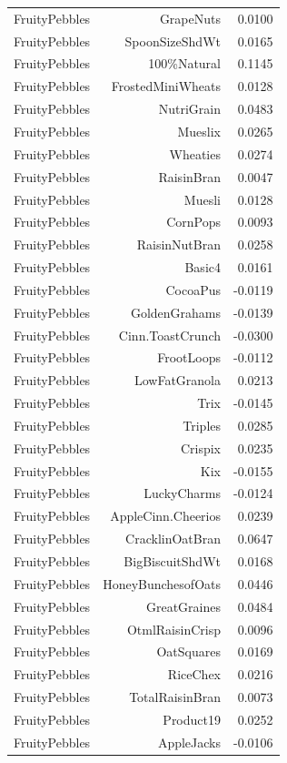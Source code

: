 \begin{longtable}{@{}lrr@{}}
FruityPebbles & GrapeNuts & 0.0100 \\
FruityPebbles & SpoonSizeShdWt & 0.0165 \\
FruityPebbles & 100\%Natural & 0.1145 \\
FruityPebbles & FrostedMiniWheats & 0.0128 \\
FruityPebbles & NutriGrain & 0.0483 \\
FruityPebbles & Mueslix & 0.0265 \\
FruityPebbles & Wheaties & 0.0274 \\
FruityPebbles & RaisinBran & 0.0047 \\
FruityPebbles & Muesli & 0.0128 \\
FruityPebbles & CornPops & 0.0093 \\
FruityPebbles & RaisinNutBran & 0.0258 \\
FruityPebbles & Basic4 & 0.0161 \\
FruityPebbles & CocoaPus & -0.0119 \\
FruityPebbles & GoldenGrahams & -0.0139 \\
FruityPebbles & Cinn.ToastCrunch & -0.0300 \\
FruityPebbles & FrootLoops & -0.0112 \\
FruityPebbles & LowFatGranola & 0.0213 \\
FruityPebbles & Trix & -0.0145 \\
FruityPebbles & Triples & 0.0285 \\
FruityPebbles & Crispix & 0.0235 \\
FruityPebbles & Kix & -0.0155 \\
FruityPebbles & LuckyCharms & -0.0124 \\
FruityPebbles & AppleCinn.Cheerios & 0.0239 \\
FruityPebbles & CracklinOatBran & 0.0647 \\
FruityPebbles & BigBiscuitShdWt & 0.0168 \\
FruityPebbles & HoneyBunchesofOats & 0.0446 \\
FruityPebbles & GreatGraines & 0.0484 \\
FruityPebbles & OtmlRaisinCrisp & 0.0096 \\
FruityPebbles & OatSquares & 0.0169 \\
FruityPebbles & RiceChex & 0.0216 \\
FruityPebbles & TotalRaisinBran & 0.0073 \\
FruityPebbles & Product19 & 0.0252 \\
FruityPebbles & AppleJacks & -0.0106 \\

\end{longtable}
